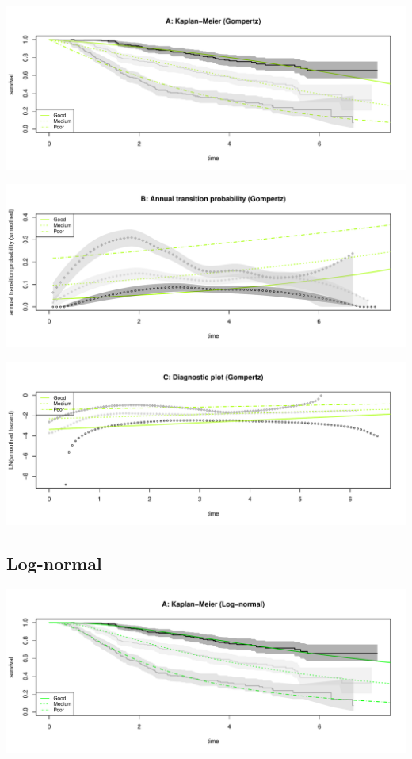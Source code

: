 \documentclass[
]{article}
\begin{document}
\begin{flushleft}\includegraphics[height=0.25\textheight]{Images/gom-1} \end{flushleft}

\begin{flushleft}\includegraphics[height=0.25\textheight]{Images/gom-2} \end{flushleft}

\begin{flushleft}\includegraphics[height=0.25\textheight]{Images/gom-3} \end{flushleft}

\clearpage

\hypertarget{log-normal}{%
\subsection{Log-normal}\label{log-normal}}

\begin{flushleft}\includegraphics[height=0.25\textheight]{Images/lnorm-1} \end{flushleft}
\end{document}
